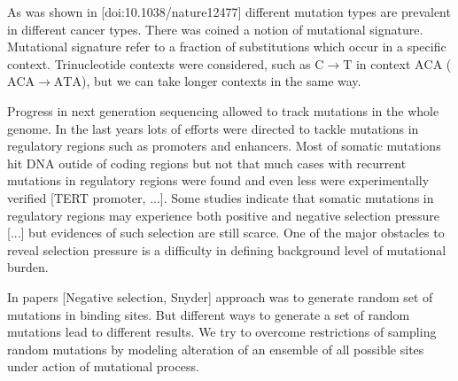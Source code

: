\documentclass[a4paper]{article}
\begin{document}
As was shown in [doi:10.1038/nature12477] different mutation types are prevalent in different cancer types. There was coined a notion of mutational signature. Mutational signature refer to a fraction of substitutions which occur in a specific context. Trinucleotide contexts were considered, such as $\mathrm{C \to T}$ in context $\mathrm{ACA}$ ($\mathrm{ACA \to ATA}$), but we can take longer contexts in the same way.

Progress in next generation sequencing allowed to track mutations in the whole genome. In the last years lots of efforts were directed to tackle mutations in regulatory regions such as promoters and enhancers. Most of somatic mutations hit DNA outide of coding regions but not that much cases with recurrent mutations in regulatory regions were found and even less were experimentally verified [TERT promoter, ...]. 
Some studies indicate that somatic mutations in regulatory regions may experience both positive and negative selection pressure [...] but evidences of such selection are still scarce. One of the major obstacles to reveal selection pressure is a difficulty in defining background level of mutational burden.

In papers [Negative selection, Snyder] approach was to generate random set of mutations in binding sites. But different ways to generate a set of random mutations lead to different results. We try to overcome restrictions of sampling random mutations by modeling alteration of an ensemble of all possible sites under action of mutational process.
\end{document}
